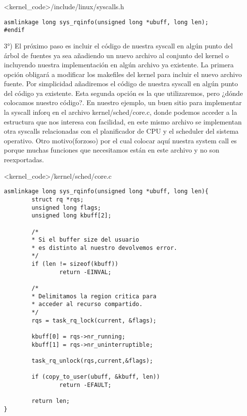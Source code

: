 <kernel\_code>/include/linux/syscalls.h
\begin{verbatim}
asmlinkage long sys_rqinfo(unsigned long *ubuff, long len);
#endif
\end{verbatim}

3°) El próximo paso es incluir el código de nuestra syscall en algún punto del árbol de fuentes ya sea añadiendo un nuevo archivo al conjunto del kernel o incluyendo nuestra implementación en algún archivo ya existente. La primera opción obligará a modificar los makefiles del kernel para incluir el nuevo archivo fuente. Por simplicidad añadiremos el código de nuestra syscall en algún punto del código ya existente. Esta segunda opción es la que utilizaremos, pero ¿dónde colocamos nuestro código?. En nuestro ejemplo, un buen sitio para implementar la syscall inforq en el archivo kernel/sched/core.c, donde podemos acceder a la estructura que nos interesa con facilidad, en este mismo archivo se implementan otra syscalls relacionadas con el planificador de CPU y el scheduler del sistema operativo.
Otro motivo(forzoso) por el cual colocar aquí nuestra system call es porque muchas funciones que necesitamos están en este archivo y no son
reexportadas.

<kernel\_code>/kernel/sched/core.c

\begin{verbatim}
asmlinkage long sys_rqinfo(unsigned long *ubuff, long len){
        struct rq *rqs;
        unsigned long flags;
        unsigned long kbuff[2];

        /*
        * Si el buffer size del usuario
        * es distinto al nuestro devolvemos error.
        */
        if (len != sizeof(kbuff))
                return -EINVAL;

        /*
        * Delimitamos la region critica para
        * acceder al recurso compartido.
        */
        rqs = task_rq_lock(current, &flags);

        kbuff[0] = rqs->nr_running;
        kbuff[1] = rqs->nr_uninterruptible;

        task_rq_unlock(rqs,current,&flags);

        if (copy_to_user(ubuff, &kbuff, len))
                return -EFAULT;

        return len;
}
\end{verbatim}


